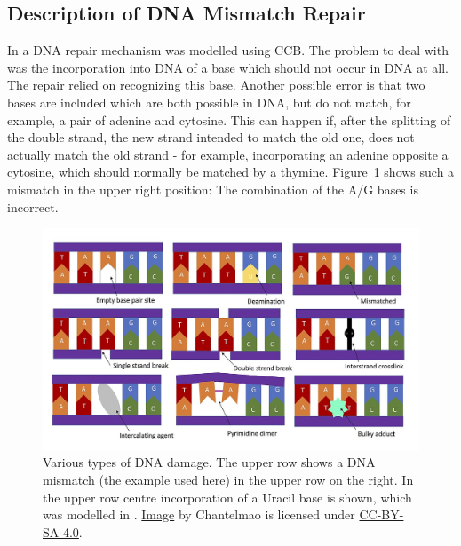 ﻿
\subsection{Description of DNA Mismatch Repair}

In \cite{10.1007/978-3-319-99498-7_8} a DNA repair mechanism was modelled using CCB. The problem to deal with was the incorporation into DNA of a base which should not occur in DNA at all. The repair relied on recognizing this base. Another possible error is that two bases are included which are both possible in DNA, but do not match, for example, a pair of adenine and cytosine. This can happen if, after the splitting of the double strand, the new strand intended to match the old one, does not actually match the old strand - for example, incorporating an adenine opposite a cytosine, which should normally be matched by a thymine. Figure~\ref{fig:damages} shows such a mismatch in the upper right position: The combination of the A/G bases is incorrect.

\begin{figure}[h!]
  \centering
    \includegraphics[width=1.0\textwidth]{mmr/Types_of_DNA_Damage}
  \caption[Various types of DNA damage.]{Various types of DNA damage. The upper row shows a DNA mismatch (the example used here) in the upper row on the right. In the upper row centre incorporation of a Uracil base is shown, which was modelled in \cite{10.1007/978-3-319-99498-7_8}.  \href{https://commons.wikimedia.org/wiki/File:Types_of_DNA_Damage.jpg}{Image} by Chantelmao is licensed under \href{https://creativecommons.org/licenses/by-sa/4.0/deed.en}{CC-BY-SA-4.0}.}
  \label{fig:damages}
\end{figure}

